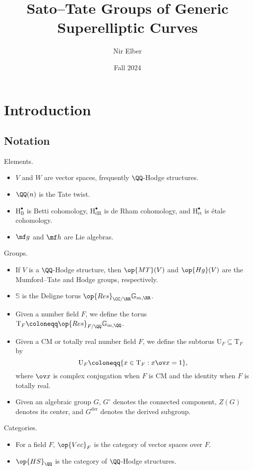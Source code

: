\documentclass[openany]{book}
\title{Sato--Tate Groups of Generic Superelliptic Curves}
\author{Nir Elber}
\date{Fall 2024}
\begin{document}
\maketitle

\nirtableofcontents

\newpage

\chapter{Introduction}
\section{Notation}
Elements.
\begin{itemize}
	\item $V$ and $W$ are vector spaces, frequently $\QQ$-Hodge structures.
	\item $\QQ(n)$ is the Tate twist.
	\item $\mathrm H_{\mathrm B}^\bullet$ is Betti cohomology, $\mathrm H_{\mathrm{dR}}^\bullet$ is de Rham cohomology, and $\mathrm H_{\mathrm{\acute et}}^\bullet$ is \'etale cohomology.
	\item $\mf g$ and $\mf h$ are Lie algebras.
\end{itemize}
Groups.
\begin{itemize}
	\item If $V$ is a $\QQ$-Hodge structure, then $\op{MT}(V)$ and $\op{Hg}(V)$ are the Mumford--Tate and Hodge groups, respectively.
	\item $\mathbb S$ is the Deligne torus $\op{Res}_{\CC/\RR}\mathbb G_{m,\RR}$.
	\item Given a number field $F$, we define the torus $\mathrm T_F\coloneqq\op{Res}_{F/\QQ}\mathbb G_{m,\QQ}$.
	\item Given a CM or totally real number field $F$, we define the subtorus $\mathrm U_F\subseteq\mathrm T_F$ by
	\[\mathrm U_F\coloneqq\{x\in\mathrm T_F:x\ov x=1\},\]
	where $\ov x$ is complex conjugation when $F$ is CM and the identity when $F$ is totally real.
	\item Given an algebraic group $G$, $G^\circ$ denotes the connected component, $Z(G)$ denotes its center, and $G^{\mathrm{der}}$ denotes the derived subgroup.
\end{itemize}
Categories.
\begin{itemize}
	\item For a field $F$, $\op{Vec}_F$ is the category of vector spaces over $F$.
	\item $\op{HS}_\QQ$ is the category of $\QQ$-Hodge structures.
\end{itemize}
\end{document}
